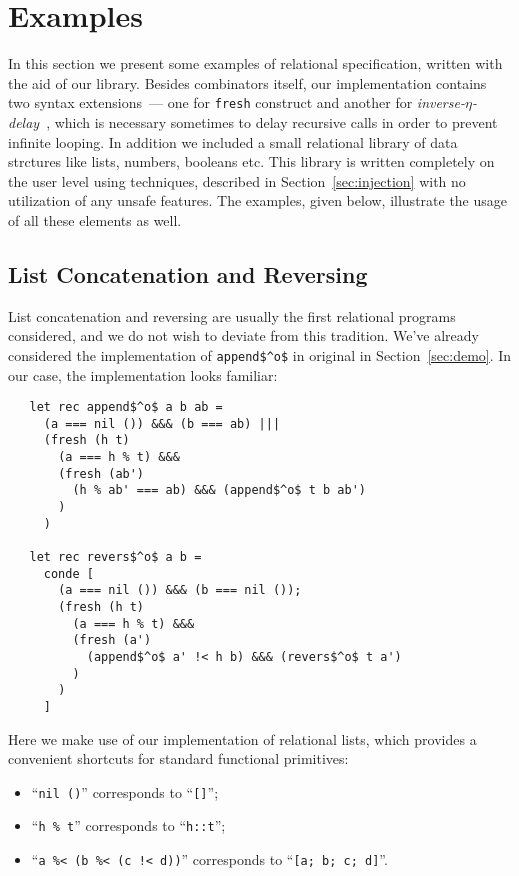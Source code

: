 \section{Examples}
\label{sec:examples}

In this section we present some examples of relational specification, written with the aid of our library. 
Besides \miniKanren combinators itself, our implementation contains two syntax extensions~--- one
for \lstinline{fresh} construct and another for \emph{inverse-$\eta$-delay}~\cite{MicroKanren}, which is 
necessary sometimes to delay recursive calls in order to prevent infinite looping. In addition we included a 
small relational library of data strctures like lists, numbers, booleans etc. This library is written 
completely on the user level using techniques, described in Section~\ref{sec:injection} with no utilization 
of any unsafe features. The examples, given below, illustrate the usage of all these elements as well.

\subsection{List Concatenation and Reversing}

List concatenation and reversing are usually the first relational programs considered, and we do not wish
to deviate from this tradition. We've already considered the implementation of \lstinline{append$^o$} in
original \miniKanren in Section~\ref{sec:demo}. In our case, the implementation looks familiar:

\begin{lstlisting}
   let rec append$^o$ a b ab =
     (a === nil ()) &&& (b === ab) |||
     (fresh (h t)
       (a === h % t) &&&
       (fresh (ab')
         (h % ab' === ab) &&& (append$^o$ t b ab') 
       )
     )

   let rec revers$^o$ a b =
     conde [
       (a === nil ()) &&& (b === nil ());
       (fresh (h t)
         (a === h % t) &&&
         (fresh (a')
           (append$^o$ a' !< h b) &&& (revers$^o$ t a')
         )
       )
     ]
\end{lstlisting}

Here we make use of our implementation of relational lists, which provides a convenient shortcuts for
standard functional primitives:

\begin{itemize}
  \item ``\lstinline{nil ()}'' corresponds to ``\lstinline{[]}'';
  \item ``\lstinline{h % t}'' corresponds to ``\lstinline{h::t}'';
  \item ``\lstinline{a %< (b %< (c !< d))}'' corresponds to ``\lstinline{[a; b; c; d]}''.
\end{itemize}

